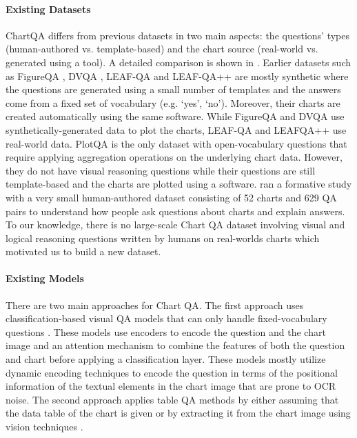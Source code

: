 \documentclass[11pt]{article}
\begin{document}
\paragraph{Existing Datasets} ChartQA differs from previous datasets in two main aspects: the questions' types (human-authored vs. template-based) and the chart source (real-world vs. generated using a tool). A detailed comparison is shown in  .  Earlier datasets such as FigureQA \cite{figureqa}, DVQA \cite{dvqa}, LEAF-QA \cite{leafqa} and LEAF-QA++ \cite{stlcqa}  are mostly synthetic where the questions are generated using a small number of templates and the answers come from a fixed set of vocabulary (e.g. `yes', `no'). Moreover, their charts are created automatically using the same software. While FigureQA and DVQA use synthetically-generated data to plot the charts, LEAF-QA and LEAFQA++ use real-world data.  PlotQA \cite{plotqa} is the only dataset with open-vocabulary questions that require applying aggregation operations on the underlying chart data. However, they do not have visual reasoning questions while their questions are still template-based and the charts are plotted using a software. 
\citet{kim2020answering} ran a formative study with a very small human-authored dataset consisting of 52 charts and 629 QA pairs to understand how people ask questions about charts and explain answers. To our knowledge, there is no large-scale Chart QA dataset involving  visual and logical reasoning questions written by humans on real-worlds charts which motivated us to build a new dataset.


\paragraph{Existing Models} 
There are two main approaches for Chart QA. The first approach uses classification-based visual QA models that can only handle fixed-vocabulary questions \cite{leafqa, stlcqa, prefil, figureqa, dvqa}. These models use encoders to encode the question and the chart image and an attention mechanism to combine the features of both the question and chart before applying a classification layer. These models mostly utilize dynamic encoding techniques to encode the question in terms of the positional information of the textual elements in the chart image that are prone to OCR noise. The second approach applies table QA methods by either assuming that the data table of the chart is given \cite{kim2020answering, ahmed-workshop-2021} or by extracting it from the chart image using vision techniques \cite{plotqa}.
\end{document}
